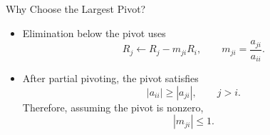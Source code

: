\documentclass[10pt]{beamer}
\begin{document}
\begin{frame}{Why Choose the Largest Pivot?}

\begin{itemize}
    \item Elimination below the pivot uses
    \[
        R_j\leftarrow R_j-m_{ji}R_i,
        \qquad
        m_{ji}=\frac{a_{ji}}{a_{ii}}.
    \]

    \item After partial pivoting, the pivot satisfies
    \[
        |a_{ii}|\ge |a_{ji}|,
        \qquad j>i.
    \]
    Therefore, assuming the pivot is nonzero,
    \[
        \boxed{|m_{ji}|\le1.}
    \]


\end{itemize}


\end{frame}
\end{document}
